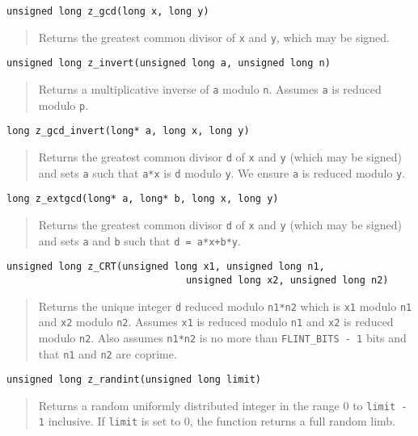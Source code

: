 \documentclass[a4paper,10pt]{article}
\newcommand{\code}{\lstinline}
\begin{document}
\begin{lstlisting}
unsigned long z_gcd(long x, long y)
\end{lstlisting}
\begin{quote}
Returns the greatest common divisor of \code{x} and \code{y}, which may be signed.
\end{quote}

\begin{lstlisting}
unsigned long z_invert(unsigned long a, unsigned long n)
\end{lstlisting}
\begin{quote}
Returns a multiplicative inverse of \code{a} modulo \code{n}. Assumes \code{a} is reduced modulo \code{p}.
\end{quote}

\begin{lstlisting}
long z_gcd_invert(long* a, long x, long y)
\end{lstlisting}
\begin{quote}
Returns the greatest common divisor \code{d} of \code{x} and \code{y} (which may be signed) and sets \code{a} such that \code{a*x} is \code{d} modulo \code{y}. We ensure \code{a} is reduced modulo \code{y}.
\end{quote}

\begin{lstlisting}
long z_extgcd(long* a, long* b, long x, long y)
\end{lstlisting}
\begin{quote}
Returns the greatest common divisor \code{d} of \code{x} and \code{y} (which may be signed) and sets \code{a} and \code{b} such that \code{d = a*x+b*y}. 
\end{quote}

\begin{lstlisting}
unsigned long z_CRT(unsigned long x1, unsigned long n1, 
                               unsigned long x2, unsigned long n2)
\end{lstlisting}
\begin{quote}
Returns the unique integer \code{d} reduced modulo \code{n1*n2} which is \code{x1} modulo \code{n1} and \code{x2} modulo \code{n2}. Assumes \code{x1} is reduced modulo \code{n1} and \code{x2} is reduced modulo \code{n2}. Also assumes \code{n1*n2} is no more than \code{FLINT_BITS - 1} bits and that \code{n1} and \code{n2} are coprime.
\end{quote}

\begin{lstlisting}
unsigned long z_randint(unsigned long limit)
\end{lstlisting}
\begin{quote}
Returns a random uniformly distributed integer in the range 0 to \code{limit - 1} inclusive. If \code{limit} is set to 0, the function returns a full random limb.
\end{quote}
 
\end{document}

